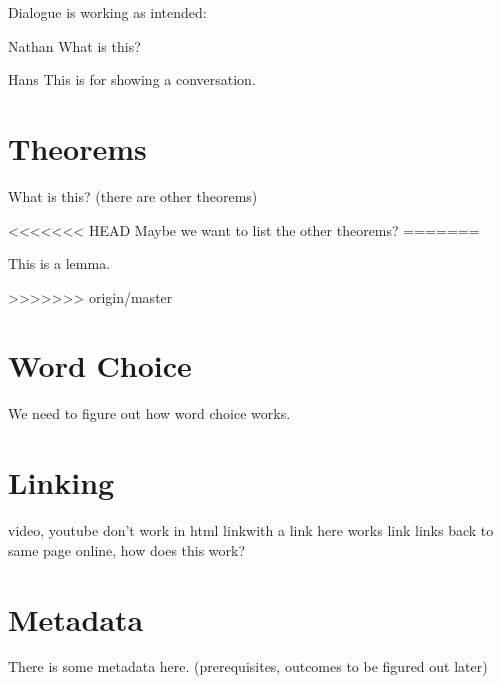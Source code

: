 \documentclass{ximera}
\begin{document}
Dialogue is working as intended:

\begin{dialogue}
\item[Nathan] What is this?
\item[Hans] This is for showing a conversation.
\end{dialogue}



\section{Theorems}

\begin{theorem}
What is this? (there are other theorems)
\end{theorem}

<<<<<<< HEAD
Maybe we want to list the other theorems?
=======
\begin{lemma}
This is a lemma.
\end{lemma}
>>>>>>> origin/master



\section{Word Choice}

We need to figure out how word choice works.



\section{Linking}

video, youtube don't work in html
link{with a link here} works
link{} links back to same page online, how does this work?

\link{} %



\section{Metadata}

There is some metadata here. (prerequisites, outcomes to be figured out later)

\end{document}
